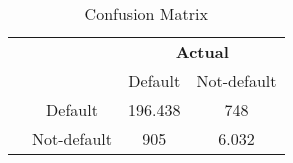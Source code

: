 \begin{table}[H]
     \centering
     \caption{Confusion Matrix}
     \label{tab:Confusion_matrix}
     \begin{tabular}{@{}cc cc@{}}
     \multicolumn{1}{c}{} &\multicolumn{1}{c}{} &\multicolumn{2}{c}{\textbf{Actual}} \\
     \cmidrule(lr){3-4}
     \multicolumn{1}{c}{} & 
     \multicolumn{1}{c}{} & 
     \multicolumn{1}{c}{Default} & 
     \multicolumn{1}{c}{Not-default} \\
     \vspace{0.1cm}
     \cline{2-4}
     \multirow[c]{2}{*}{\rotatebox[origin=tr]{90}{\textbf{Predicted}}} & Default  & 196.438&748 \\[1.5ex] & Not-default &905&6.032 \\ \cline{2-4}
     \end{tabular}
     \end{table}